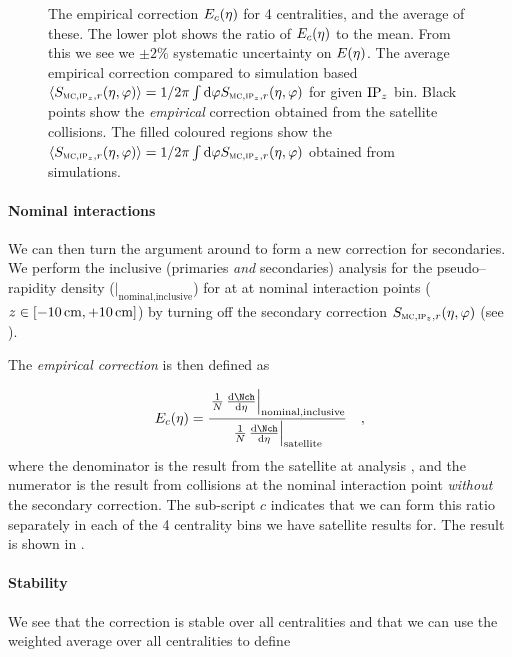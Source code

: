 \begin{figure}[h!tbp]
  \centering
  \caption{ The empirical correction
    $\EmpCor[c]{}$ for 4 centralities, and the average of these.  The
    lower plot shows the ratio of $\EmpCor[c]{}$ to the mean.  From
    this we see we $\pm2\%$ systematic uncertainty on
    $\EmpCor{}$.  The average empirical
    correction compared to simulation based
    $\langle\SecMap\rangle=1/2\pi\int\text{d}\varphi\SecMap{}$ for
    given $\IPz{}$ bin. Black points show the \emph{empirical}
    correction obtained from the satellite \PbPbCol{} collisions.  The
    filled coloured regions show the
    $\langle\SecMap\rangle=1/2\pi\int\text{d}\varphi\SecMap{}$
    obtained from simulations.} 
\end{figure}


\paragraph{Nominal interactions} 
We can then turn the argument around to form a new correction for
secondaries.  We perform the inclusive (primaries \emph{and}
secondaries) analysis for the pseudo--rapidity density
(\ndndeta{}$|_{\text{nominal,inclusive}}$) for \PbPbCol{} at
 at nominal interaction points
($z\in[\unit[-10]{\text{cm}},\unit[+10]{\text{cm}}]$) by turning off
the secondary correction $\SecMap$ (see
). 

The \emph{empirical correction} is then defined as

\begin{equation}
  \label{eq:empirical:cent}
  \EmpCor[c]{} = \frac{%
    \left.\ndndeta\right|_{\text{nominal,inclusive}}}{%
    \left.\ndndeta\right|_{\text{satellite}}}\quad,
\end{equation}
where the denominator is the result from the satellite \PbPbCol{} at
 analysis \cite{Abbas:2013bpa}, and the numerator is
the result from collisions at the nominal interaction point
\emph{without} the secondary correction.  The sub-script $c$ indicates
that we can form this ratio separately in each of the 4 centrality
bins we have satellite results for.  The result is shown in
.

\paragraph{Stability}
We see that the correction is stable over all centralities and that we
can use the weighted average over all centralities to define 

